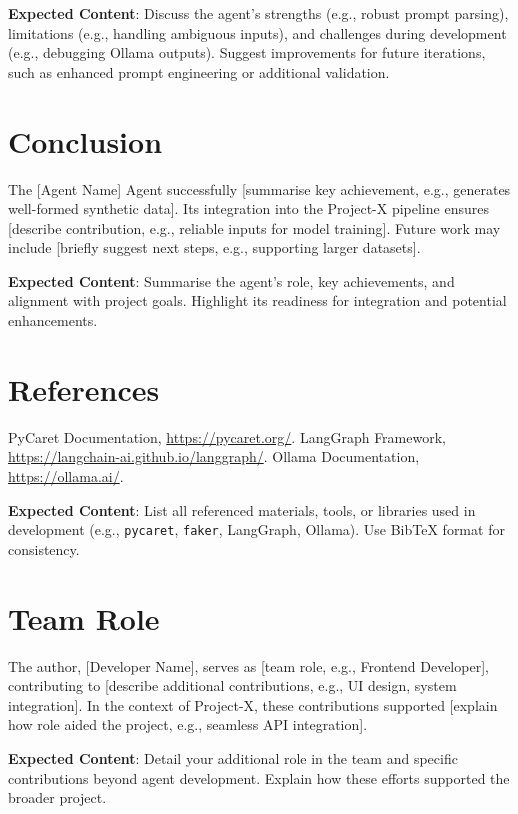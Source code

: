 \documentclass{article}
\begin{document}
\textbf{Expected Content}: Discuss the agent’s strengths (e.g., robust prompt parsing), limitations (e.g., handling ambiguous inputs), and challenges during development (e.g., debugging Ollama outputs). Suggest improvements for future iterations, such as enhanced prompt engineering or additional validation.

\section{Conclusion}
The [Agent Name] Agent successfully [summarise key achievement, e.g., generates well-formed synthetic data]. Its integration into the Project-X pipeline ensures [describe contribution, e.g., reliable inputs for model training]. Future work may include [briefly suggest next steps, e.g., supporting larger datasets].

\textbf{Expected Content}: Summarise the agent’s role, key achievements, and alignment with project goals. Highlight its readiness for integration and potential enhancements.

\section{References}
\begin{thebibliography}{9}
 PyCaret Documentation, \url{https://pycaret.org/}.
 LangGraph Framework, \url{https://langchain-ai.github.io/langgraph/}.
 Ollama Documentation, \url{https://ollama.ai/}.
\end{thebibliography}

\textbf{Expected Content}: List all referenced materials, tools, or libraries used in development (e.g., \texttt{pycaret}, \texttt{faker}, LangGraph, Ollama). Use BibTeX format for consistency.

\section{Team Role}
The author, [Developer Name], serves as [team role, e.g., Frontend Developer], contributing to [describe additional contributions, e.g., UI design, system integration]. In the context of Project-X, these contributions supported [explain how role aided the project, e.g., seamless API integration].

\textbf{Expected Content}: Detail your additional role in the team and specific contributions beyond agent development. Explain how these efforts supported the broader project.
\end{document}
